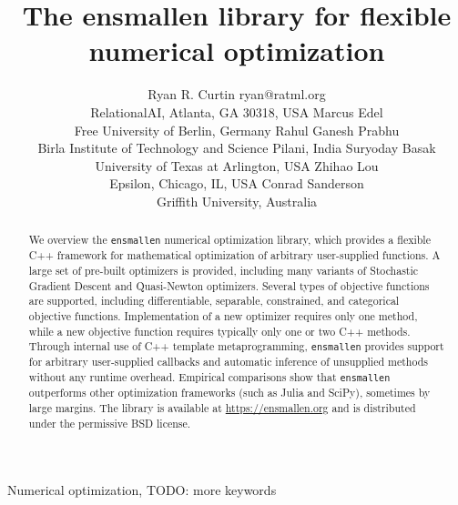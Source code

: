 \documentclass[twoside,11pt]{article}
\begin{document}
\title{The ensmallen library for flexible numerical optimization}

\author{\name Ryan R. Curtin \email ryan@ratml.org \\
       \addr RelationalAI, Atlanta, GA 30318, USA
       \AND
       \name Marcus Edel\\
       \addr Free University of Berlin, Germany
       \AND
       \name Rahul Ganesh Prabhu \\
       \addr Birla Institute of Technology and Science Pilani, India
       \AND
       \name Suryoday Basak \\
       \addr University of Texas at Arlington, USA
       \AND
       \name Zhihao Lou \\
       \addr Epsilon, Chicago, IL, USA
       \AND
       \name Conrad Sanderson \\
       \addr Griffith University, Australia}


\maketitle

\begin{abstract}%
We overview the {\tt ensmallen} numerical optimization library,
which provides a flexible C++ framework
for mathematical optimization of arbitrary user-supplied functions.
A large set of pre-built optimizers is provided,
including many variants of Stochastic Gradient Descent and Quasi-Newton optimizers.
Several types of objective functions are supported, including differentiable,
separable, constrained, and categorical objective functions.
Implementation of a new optimizer requires only one method,
while a new objective function requires typically only one or two C++ methods.
Through internal use of C++ template metaprogramming, {\tt ensmallen} provides support for arbitrary
user-supplied callbacks and automatic inference of unsupplied methods without
any runtime overhead.
Empirical comparisons show that {\tt ensmallen}
outperforms other optimization frameworks (such as Julia and SciPy), sometimes
by large margins.  The library is available at \url{https://ensmallen.org}
and is distributed under the permissive BSD license.

\end{abstract}

\begin{keywords}
  Numerical optimization, TODO: more keywords
\end{keywords}
\end{document}
